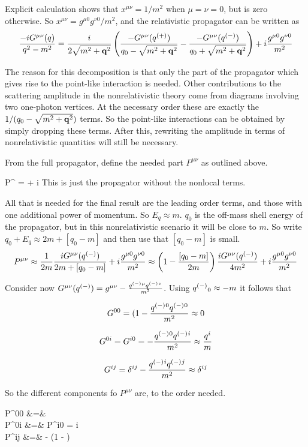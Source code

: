 Explicit calculation shows that $x^{\mu\nu}=1/m^2$ when $\mu=\nu=0$, but is zero otherwise.  So $x^{\mu\nu} = g^{\mu0} g^{\nu0} /m^2$, and the relativistic propagator can be written as
\[
	\frac{ -i G^{\mu\nu}(q) }{q^2 - m^2} = \frac{i}{2 \sqrt{ m^2 + \mathbf{q}^2 }} \left(  \frac{ -G^{\mu\nu}(q^{(+)}{})  }{q_0 - \sqrt{ m^2 + \mathbf{q}^2 } } - \frac{ -G^{\mu\nu}(q^{(-)}{})  }{q_0 + \sqrt{ m^2 + \mathbf{q}^2 } } \right) + i\frac{g^{\mu0} g^{\nu0}}{m^2}
\]

The reason for this decomposition is that only the part of the propagator which gives rise to the point-like interaction is needed.  Other contributions to the scattering amplitude in the nonrelativistic theory come from diagrams involving two one-photon vertices.  At the necessary order these are exactly the $1/(q_0 - \sqrt{ m^2 + \mathbf{q}^2 })$ terms.  So the point-like interactions can be obtained by simply dropping these terms.  After this, rewriting the amplitude in terms of nonrelativistic quantities will still be necessary.


From the full propagator, define the needed part $P^{\mu\nu}$ as outlined above.

\beq
	P^{\mu\nu} =      + i
\eeq
This is just the propagator without the nonlocal terms.

All that is needed for the final result are the leading order terms, and those with one additional power of momentum.  So $E_q  \approx m$.  $q_0$ is the off-mass shell energy of the propagator, but in this nonrelativistic scenario it will be close to $m$.  So write $q_0 + E_q \approx 2m + [q_0-m]$ and then use that $[q_0-m]$ is small.
\[
	P^{\mu\nu} \approx   \frac{1}{2m} \frac{i G^{\mu\nu}(q^{(-)}{})  }{2m + [q_0-m]} + i\frac{g^{\mu0} g^{\nu0}}{m^2}
			\approx \left( 1 - \frac{[q_0-m]}{2m} \right )\frac{ i G^{\mu\nu}(q^{(-)}{})  }{4m^2} + i \frac{g^{\mu0} g^{\nu0}}{m^2}
\]

Consider now $G^{\mu\nu}(q^{(-)}{}) = g^{\mu\nu} - \frac{q^{(-)}{}^\mu q^{(-)}{}^\nu}{m^2}$.  Using $q^{(-)}{}_0 \approx -m$ it follows that

\[
	G^{00} = (1 - \frac{q^{(-)}{}^0 q^{(-)}{}^0}{m^2} \approx  0
\]

\[
	G^{0i} = G^{i0} =  - \frac{q^{(-)}{}^0 q^{(-)}{}^i}{m^2} \approx  \frac{q^i}{m}
\]


\[
	G^{ij} = \delta^{ij} - \frac{q^{(-)}{}^i q^{(-)}{}^j}{m^2} \approx \delta^{ij}
\]

So the different components fo $P^{\mu\nu}$ are, to the order needed.

\beqa \label{eq:S1:Pvalues}
 P^{00} &=&  	\\
 P^{0i} &=& P^{i0} = i		\\
 P^{ij} &=& - \left(1 -  \right ) 	
\eeqa


